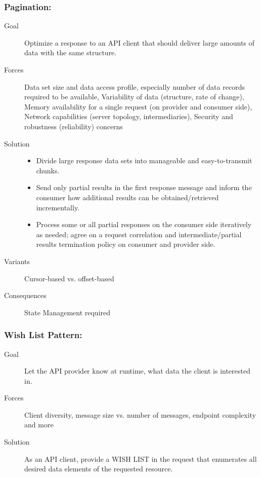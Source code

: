 \documentclass[../Main.tex]{subfiles}
\begin{document}
\subsubsection{Pagination:}
\begin{description}
    \item[Goal] Optimize a response to an API client that should deliver large amounts of data with the same structure.
    \item[Forces] Data set size and data access profile, especially number of data records required to be available,
    Variability of data (structure, rate of change),
    Memory availability for a single request (on provider and consumer side),
    Network capabilities (server topology, intermediaries),
    Security and robustness (reliability) concerns
    \item[Solution] \begin{itemize}
        \item  Divide large response data sets into manageable and easy-to-transmit chunks.
        \item Send only partial results in the first response message and inform the consumer how 
        additional results can be obtained/retrieved incrementally. 
        \item Process some or all partial responses on the consumer side iteratively as needed; agree 
        on a request correlation and intermediate/partial results termination policy on consumer 
        and provider side.
    \end{itemize}
    \item[Variants] Cursor-based vs. offset-based
    \item[Consequences] State Management required
\end{description}

\subsubsection{Wish List Pattern:}
\begin{description}
    \item[Goal] Let the API provider know at runtime, what data the client is interested in.
    \item[Forces] Client diversity, message size vs. number of messages, endpoint complexity and more
    \item[Solution] As an API client, provide a WISH LIST in the request that enumerates all desired data elements of the requested resource.
\end{description}
\end{document}
